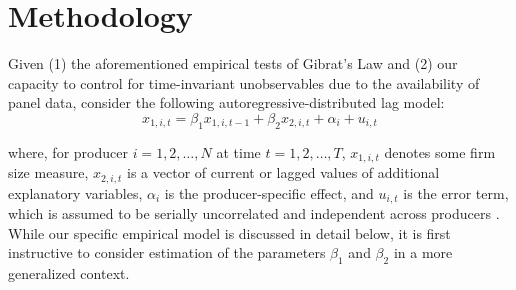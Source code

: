\documentclass[english]{article}
\begin{document}

\section{Methodology}
\label{sec: methodology}

Given (1) the aforementioned empirical tests of Gibrat's Law and (2) our capacity to control for time-invariant unobservables due to the availability of panel data, consider the following autoregressive-distributed lag model: 
\begin{equation}
x_{1,i,t} = \beta_1 x_{1,i,t-1} + \beta_2 x_{2,i,t} + \alpha_i +  u_{i,t}
\label{adl}
\end{equation}

\noindent
where, for producer $i=1,2,\ldots,N$ at time $t=1,2,\ldots,T$, $x_{1,i,t}$ denotes some firm size measure, $x_{2,i,t}$ is a vector of current or lagged values of additional explanatory variables, $\alpha_i$ is the producer-specific effect, and $u_{i,t}$ is the error term, which is assumed to be serially uncorrelated and independent across producers \citep{bond2002}. While our specific empirical model is discussed in detail below, it is first instructive to consider estimation of the parameters $\beta_1$ and $\beta_2$ in a more generalized context.
\end{document}
